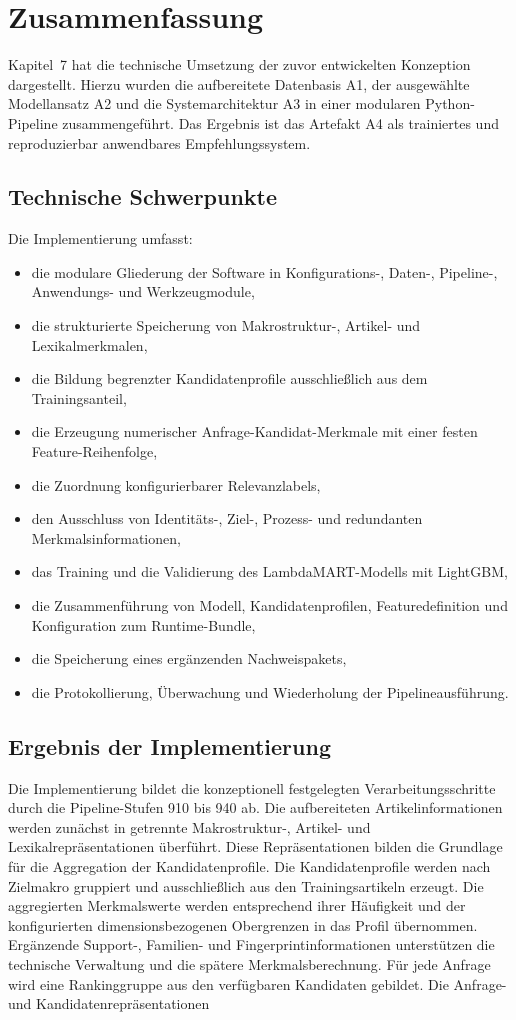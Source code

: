 \section{Zusammenfassung} \label{sec:zusammenfassung_implementierung} Kapitel~7 hat die technische Umsetzung der zuvor entwickelten Konzeption dargestellt. Hierzu wurden die aufbereitete Datenbasis A1, der ausgewählte Modellansatz A2 und die Systemarchitektur A3 in einer modularen Python-Pipeline zusammengeführt. Das Ergebnis ist das Artefakt A4 als trainiertes und reproduzierbar anwendbares Empfehlungssystem. \subsection{Technische Schwerpunkte} \label{subsec:technische_schwerpunkte_zusammenfassung} Die Implementierung umfasst: \begin{itemize} \item die modulare Gliederung der Software in Konfigurations-, Daten-, Pipeline-, Anwendungs- und Werkzeugmodule, \item die strukturierte Speicherung von Makrostruktur-, Artikel- und Lexikalmerkmalen, \item die Bildung begrenzter Kandidatenprofile ausschließlich aus dem Trainingsanteil, \item die Erzeugung numerischer Anfrage-Kandidat-Merkmale mit einer festen Feature-Reihenfolge, \item die Zuordnung konfigurierbarer Relevanzlabels, \item den Ausschluss von Identitäts-, Ziel-, Prozess- und redundanten Merkmalsinformationen, \item das Training und die Validierung des LambdaMART-Modells mit LightGBM, \item die Zusammenführung von Modell, Kandidatenprofilen, Featuredefinition und Konfiguration zum Runtime-Bundle, \item die Speicherung eines ergänzenden Nachweispakets, \item die Protokollierung, Überwachung und Wiederholung der Pipelineausführung. \end{itemize} \subsection{Ergebnis der Implementierung} \label{subsec:ergebnis_der_implementierung} Die Implementierung bildet die konzeptionell festgelegten Verarbeitungsschritte durch die Pipeline-Stufen 910 bis 940 ab. Die aufbereiteten Artikelinformationen werden zunächst in getrennte Makrostruktur-, Artikel- und Lexikalrepräsentationen überführt. Diese Repräsentationen bilden die Grundlage für die Aggregation der Kandidatenprofile. Die Kandidatenprofile werden nach Zielmakro gruppiert und ausschließlich aus den Trainingsartikeln erzeugt. Die aggregierten Merkmalswerte werden entsprechend ihrer Häufigkeit und der konfigurierten dimensionsbezogenen Obergrenzen in das Profil übernommen. Ergänzende Support-, Familien- und Fingerprintinformationen unterstützen die technische Verwaltung und die spätere Merkmalsberechnung. Für jede Anfrage wird eine Rankinggruppe aus den verfügbaren Kandidaten gebildet. Die Anfrage- und Kandidatenrepräsentationen 
